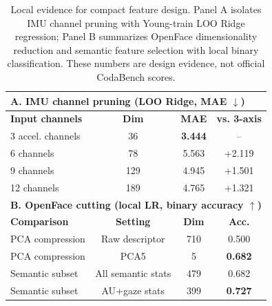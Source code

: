 \begin{table}[!t]
\centering
\caption{Local evidence for compact feature design. Panel A isolates IMU
channel pruning with Young-train LOO Ridge regression; Panel B summarizes
OpenFace dimensionality reduction and semantic feature selection with local
binary classification. These numbers are design evidence, not official
CodaBench scores.}
\label{tab:feature_cutting_binary}
\small
\setlength{\tabcolsep}{5pt}
\renewcommand{\arraystretch}{1.08}
\begin{tabular}{lccc}
\toprule
\multicolumn{4}{l}{\textbf{A. IMU channel pruning (LOO Ridge, MAE $\downarrow$)}} \\
\midrule
\textbf{Input channels} & \textbf{Dim} & \textbf{MAE} & \textbf{vs. 3-axis} \\
\midrule
3 accel. channels & 36  & \textbf{3.444} & -- \\
6 channels        & 78  & 5.563          & +2.119 \\
9 channels        & 129 & 4.945          & +1.501 \\
12 channels       & 189 & 4.765          & +1.321 \\
\midrule
\multicolumn{4}{l}{\textbf{B. OpenFace cutting (local LR, binary accuracy $\uparrow$)}} \\
\midrule
\textbf{Comparison} & \textbf{Setting} & \textbf{Dim} & \textbf{Acc.} \\
\midrule
PCA compression & Raw descriptor    & 710 & 0.500 \\
PCA compression & PCA5              & 5   & \textbf{0.682} \\
Semantic subset & All semantic stats & 479 & 0.682 \\
Semantic subset & AU+gaze stats      & 399 & \textbf{0.727} \\

\bottomrule
\end{tabular}
\end{table}
